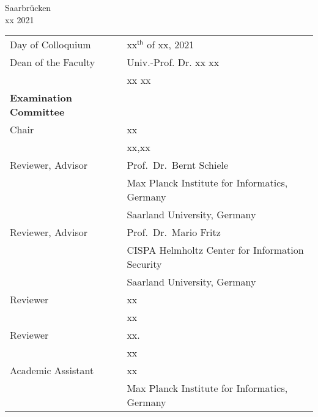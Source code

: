 \begin{titlepage}
\begin{center}
Saarbr\"ucken\\ 
xx 2021\\
\end{center}

\newpage


{\begin{flushleft}\large
\begin{tabular}{ll}
Day of Colloquium & xx${}^\mathsf{th}$ \hspace*{-0.55mm}of xx, 2021\\[2cm]
Dean of the Faculty & Univ.-Prof. Dr. xx xx \\
&xx xx\\[2cm]

\textbf{Examination Committee}\\
Chair & xx\\
&xx,xx\\[0.5cm]
Reviewer, Advisor & Prof.\ Dr.\ Bernt Schiele\\
& Max Planck Institute for Informatics, Germany\\
&Saarland University, Germany\\[0.5cm]
Reviewer, Advisor & Prof.\ Dr.\ Mario Fritz\\
& CISPA Helmholtz Center for Information Security\\
&Saarland University, Germany\\[0.5cm]
Reviewer & xx\\
& xx\\[0.5cm]
Reviewer & xx.\\
& xx\\[0.5cm]
Academic Assistant & xx \\
& Max Planck Institute for Informatics, Germany\\[2cm]
\end{tabular}

\begin{tabular}{ll} 
 
\end{tabular}
\end{flushleft}}
\end{titlepage}



